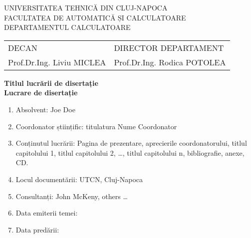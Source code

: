 \documentclass[12pt,a4paper,twoside]{report}
\begin{document}
\begin{titlepage}

\begin{center}
UNIVERSITATEA TEHNICĂ DIN CLUJ-NAPOCA\\
FACULTATEA DE AUTOMATICĂ ȘI CALCULATOARE\\
DEPARTAMENTUL CALCULATOARE\\

\vspace{1cm}

%
\begin{tabularx}{\textwidth}{lR}
DECAN & DIRECTOR DEPARTAMENT \\
Prof.Dr.Ing. Liviu MICLEA & Prof.Dr.Ing. Rodica POTOLEA\\
\end{tabularx}

\vspace {3cm}

\Huge \textbf{Titlul lucrării de disertație}\\
\vspace {1cm}
\Large \textbf{Lucrare de disertație}\\
\vspace{1cm}

\end{center}


\begin{flushleft}
\begin{enumerate}
 \item Absolvent: Joe Doe

 \item Coordonator științific: titulatura Nume Coordonator

 \item Conținutul lucrării: Pagina de prezentare, aprecierile coordonatorului, titlul capitolului 1, titlul capitolului 2, \dots, titlul capitolului n, bibliografie, anexe, CD.

 \item Locul documentării: UTCN, Cluj-Napoca

 \item Consultanți: John McKeny, others \dots

 \item Data emiterii temei: \dotfill

 \item Data predării:
\end{enumerate}

\end{flushleft}


\end{titlepage}
\end{document}
